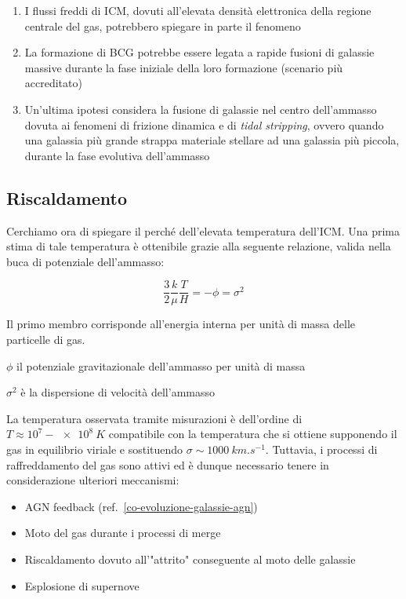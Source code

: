 \begin{enumerate}
    \item I flussi freddi di ICM, dovuti all’elevata densità elettronica della regione centrale del gas, potrebbero spiegare in parte il fenomeno
    \item La formazione di BCG potrebbe essere legata a rapide fusioni di galassie massive durante la fase iniziale della loro formazione (scenario più accreditato)
    \item Un'ultima ipotesi considera la fusione di galassie nel centro dell’ammasso dovuta ai fenomeni di frizione dinamica e di \emph{tidal stripping}, ovvero quando una galassia più grande strappa materiale stellare ad una galassia più piccola, durante la fase evolutiva dell’ammasso
\end{enumerate}

\subsection{Riscaldamento}
Cerchiamo ora di spiegare il perché dell'elevata temperatura dell'ICM.
Una prima stima di tale temperatura è ottenibile grazie alla seguente relazione, valida nella buca di potenziale dell'ammasso:

\begin{equation}
    \frac{3}{2} \frac{k}{\mu} \frac{T}{H} = -\phi =\sigma ^2
\end{equation}

\noindent Il primo membro corrisponde all'energia interna per unità di massa delle particelle di gas.

\begin{description}
    \item $\phi$ il potenziale gravitazionale dell'ammasso per unità di massa
    \item $\sigma^2$ è la dispersione di velocità dell'ammasso
\end{description}

La temperatura osservata tramite misurazioni è dell'ordine di $T \approx 10^7-\SI{e8}{K} $ compatibile con la temperatura che si ottiene supponendo il gas in equilibrio viriale e sostituendo $\sigma \sim \SI{1000}{km.s^{-1}}$.
Tuttavia, i processi di raffreddamento del gas sono attivi ed è dunque necessario tenere in considerazione ulteriori meccanismi:

\begin{itemize}
    \item AGN feedback (ref.~\ref{co-evoluzione-galassie-agn})
    \item Moto del gas durante i processi di merge 
    \item Riscaldamento dovuto all'"attrito" conseguente al moto delle galassie 
    \item Esplosione di supernove
\end{itemize}

